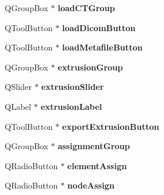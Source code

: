 \begin{DoxyCompactItemize}
\item 
\hypertarget{class_ui___main_window_adebc20d4cc30fb0288dce155d2dfc7b4}{
QGroupBox $\ast$ {\bfseries loadCTGroup}}
\label{class_ui___main_window_adebc20d4cc30fb0288dce155d2dfc7b4}

\item 
\hypertarget{class_ui___main_window_a4075f262f6210d74faaccc68776740bb}{
QToolButton $\ast$ {\bfseries loadDicomButton}}
\label{class_ui___main_window_a4075f262f6210d74faaccc68776740bb}

\item 
\hypertarget{class_ui___main_window_a0f44c8651fe62c64f614307b0db848a8}{
QToolButton $\ast$ {\bfseries loadMetafileButton}}
\label{class_ui___main_window_a0f44c8651fe62c64f614307b0db848a8}

\item 
\hypertarget{class_ui___main_window_a460e736f5823e29846f9b193d68c30ba}{
QGroupBox $\ast$ {\bfseries extrusionGroup}}
\label{class_ui___main_window_a460e736f5823e29846f9b193d68c30ba}

\item 
\hypertarget{class_ui___main_window_aaa97e3698ec459fa9717f2b8e7b5fe04}{
QSlider $\ast$ {\bfseries extrusionSlider}}
\label{class_ui___main_window_aaa97e3698ec459fa9717f2b8e7b5fe04}

\item 
\hypertarget{class_ui___main_window_a8e6fb8be78d5e3aed4a44ab925f65773}{
QLabel $\ast$ {\bfseries extrusionLabel}}
\label{class_ui___main_window_a8e6fb8be78d5e3aed4a44ab925f65773}

\item 
\hypertarget{class_ui___main_window_a7c4931e2600fe79533e7500e5b4db7d5}{
QToolButton $\ast$ {\bfseries exportExtrusionButton}}
\label{class_ui___main_window_a7c4931e2600fe79533e7500e5b4db7d5}

\item 
\hypertarget{class_ui___main_window_a68fce3c7bffad3890b13b6d5812d9f26}{
QGroupBox $\ast$ {\bfseries assignmentGroup}}
\label{class_ui___main_window_a68fce3c7bffad3890b13b6d5812d9f26}

\item 
\hypertarget{class_ui___main_window_ac1dd74c6b474e003972a179670232e2b}{
QRadioButton $\ast$ {\bfseries elementAssign}}
\label{class_ui___main_window_ac1dd74c6b474e003972a179670232e2b}

\item 
\hypertarget{class_ui___main_window_adce6a9e25e1e52d74601c417dc43ec4f}{
QRadioButton $\ast$ {\bfseries nodeAssign}}
\label{class_ui___main_window_adce6a9e25e1e52d74601c417dc43ec4f}


\end{DoxyCompactItemize}
